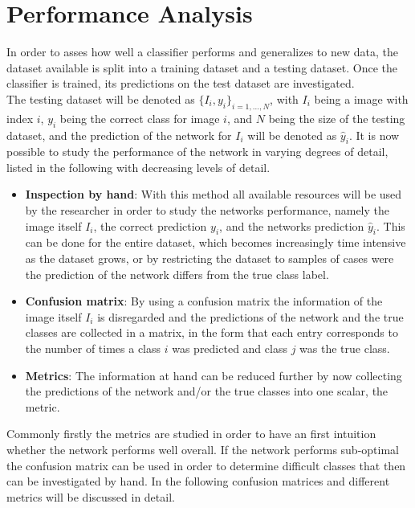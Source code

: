 \section{Performance Analysis}

In order to asses how well a classifier performs and generalizes to new data, the dataset available is split into a training dataset and a testing dataset. Once the classifier is trained, its predictions on the test dataset are investigated. \\

The testing dataset will be denoted as $\{I_i,y_i\}_{i=1,\dots ,N} $, with $I_i$ being a image with index $i$, $y_i$ being the correct class for image $i$, and $N$ being the size of the testing dataset, and the prediction of the network for $I_i$ will be denoted as $\hat{y}_i$. It is now possible to study the performance of the network in varying degrees of detail, listed in the following with decreasing levels of detail.

\begin{itemize}
\item \textbf{Inspection by hand}: With this method all available resources will be used by the researcher in order to study the networks performance, namely the image itself $I_i$, the correct prediction $y_i$, and the networks prediction $\hat{y}_i$. This can be done for the entire dataset, which becomes increasingly time intensive as the dataset grows, or by restricting the dataset to samples of cases were the prediction of the network differs from the true class label.
\item \textbf{Confusion matrix}: By using a confusion matrix the information of the image itself $I_i$ is disregarded and the predictions of the network and the true classes are collected in a matrix, in the form that each entry corresponds to the number of times a class $i$ was predicted and class $j$ was the true class.
\item \textbf{Metrics}: The information at hand can be reduced further by now collecting the predictions of the network and/or the true classes into one scalar, the metric. 
\end{itemize}

Commonly firstly the metrics are studied in order to have an first intuition whether the network performs well overall. If the network performs sub-optimal the confusion matrix can be used in order to determine difficult classes that then can be investigated by hand. In the following confusion matrices and different metrics will be discussed in detail.


